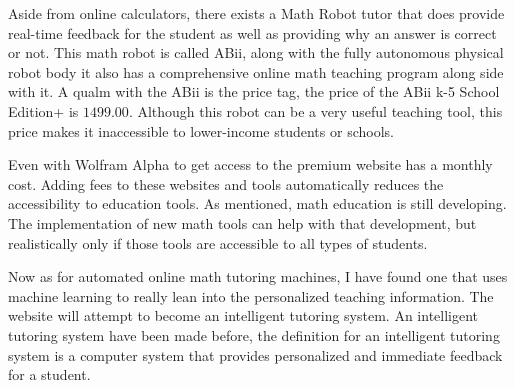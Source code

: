 \documentclass[10pt,twocolumn]{article}
\begin{document}
Aside from online calculators, there exists a Math Robot tutor that does provide real-time feedback for the student as well as providing why an answer is correct or not. This math robot is called ABii, along with the fully autonomous physical robot body it also has a comprehensive online math teaching program along side with it. A qualm with the ABii is  the price tag, the price of the ABii k-5 School Edition+ is $1499.00$. Although this robot can be a very useful teaching tool, this price makes it inaccessible to lower-income students or schools. 

Even with Wolfram Alpha to get access to the premium website has a monthly cost. Adding fees to these websites and tools automatically reduces the accessibility to education tools. As mentioned, math education is still developing. The implementation of new math tools can help with that development, but realistically only if those tools are accessible to all types of students. 

Now as for automated online math tutoring machines, I have found one that uses machine learning to really lean into the personalized teaching information. The website will attempt to become an intelligent tutoring system. An intelligent tutoring system have been made before, the definition for an intelligent tutoring system is a computer system that provides personalized and immediate feedback for a student.  

\begin{comment}
No definition citations, unless the term itself is in dispute
Separate problem background from technical background
    Unclear if games and apps require much technical background
    The general structure of the framework might be better suited for the Architecture Overview section
        Eg. Flask uses decorators to associate functions with URLs
        Eg. Unity has scripts associated with objects and specific triggers, such as walking into an area, pressing a button, etc.
    Maybe a better name is "algorithmic background"?
        Should explore what does and doesn't count
            All ML counts
            App and game frameworks do not
        Framework vs. library?
            I like the idea of [inversion of control](https://martinfowler.com/bliki/InversionOfControl.html), but that may be too abstract for students to understand
        Heuristic: is understanding that system necessary to understand the results?
            Ie. How Flask or Unity works doesn't influence whether the app/game is useful/fun/engaging
            But how (say) linear regression works is highly relevant for why the results match/don't match the actual values
\end{comment}

\printbibliography 
\end{document}
